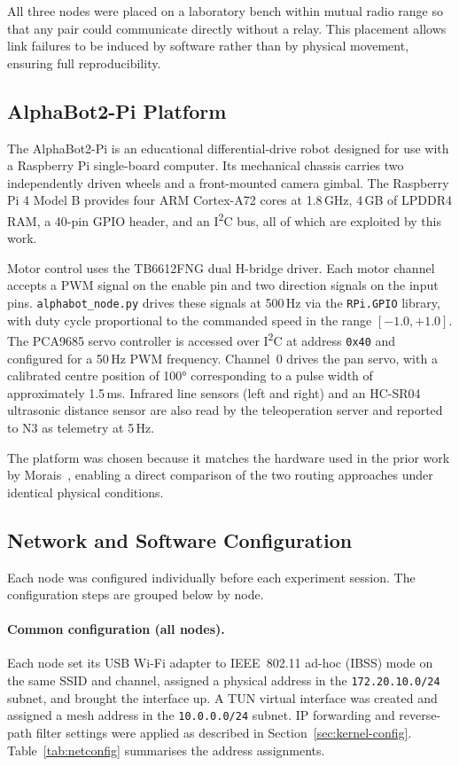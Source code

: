 All three nodes were placed on a laboratory bench within mutual radio range
so that any pair could communicate directly without a relay. This placement
allows link failures to be induced by software rather than by physical
movement, ensuring full reproducibility.

\subsection{AlphaBot2-Pi Platform}
\label{subsec:alphabot}

The AlphaBot2-Pi is an educational differential-drive robot designed for use
with a Raspberry Pi single-board computer. Its mechanical chassis carries two
independently driven wheels and a front-mounted camera gimbal. The Raspberry
Pi 4 Model B provides four ARM Cortex-A72 cores at 1.8\,GHz, 4\,GB of
LPDDR4 RAM, a 40-pin GPIO header, and an I\textsuperscript{2}C bus, all of
which are exploited by this work.

Motor control uses the TB6612FNG dual H-bridge driver. Each motor channel
accepts a PWM signal on the enable pin and two direction signals on the input
pins. \texttt{alphabot\_node.py} drives these signals at 500\,Hz via the
\texttt{RPi.GPIO} library, with duty cycle proportional to the commanded
speed in the range $[-1.0, +1.0]$. The PCA9685 servo controller is accessed
over I\textsuperscript{2}C at address \texttt{0x40} and configured for a
50\,Hz PWM frequency. Channel~0 drives the pan servo, with a calibrated
centre position of 100° corresponding to a pulse width of approximately
1.5\,ms. Infrared line sensors (left and right) and an HC-SR04 ultrasonic
distance sensor are also read by the teleoperation server and reported to
N3 as telemetry at 5\,Hz.

The platform was chosen because it matches the hardware used in the prior
work by Morais~\cite{morais2024synchronization}, enabling a direct comparison
of the two routing approaches under identical physical conditions.

\subsection{Network and Software Configuration}
\label{subsec:netconfig}

Each node was configured individually before each experiment session. The
configuration steps are grouped below by node.

\paragraph{Common configuration (all nodes).}
Each node set its USB Wi-Fi adapter to IEEE~802.11 ad-hoc (IBSS) mode on the
same SSID and channel, assigned a physical address in the
\texttt{172.20.10.0/24} subnet, and brought the interface up. A TUN virtual
interface was created and assigned a mesh address in the \texttt{10.0.0.0/24}
subnet. IP forwarding and reverse-path filter settings were applied as
described in Section~\ref{sec:kernel-config}. Table~\ref{tab:netconfig}
summarises the address assignments.

